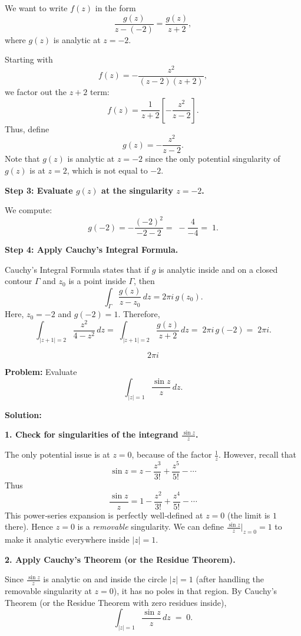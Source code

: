 \documentclass[12pt]{article}
\theoremstyle{definition} %
\theoremstyle{plain} %
\begin{document}
We want to write \(f(z)\) in the form
\[
\frac{g(z)}{z-(-2)} = \frac{g(z)}{z+2},
\]
where \(g(z)\) is analytic at \(z=-2\).

Starting with
\[
f(z) = -\frac{z^2}{(z-2)(z+2)},
\]
we factor out the \(z+2\) term:
\[
f(z) = \frac{1}{z+2}\left[-\frac{z^2}{z-2}\right].
\]
Thus, define
\[
g(z) = -\frac{z^2}{z-2}.
\]
Note that \(g(z)\) is analytic at \(z=-2\) since the only potential singularity of \(g(z)\) is at \(z=2\), which is not equal to \(-2\).

\textbf{Step 3: Evaluate \(g(z)\) at the singularity \(z=-2\).}

We compute:
\[
g(-2) = -\frac{(-2)^2}{-2-2} 
=\; -\frac{4}{-4} 
=\; 1.
\]

\textbf{Step 4: Apply Cauchy's Integral Formula.}

Cauchy's Integral Formula states that if \(g\) is analytic inside and on a closed contour \(\Gamma\) and \(z_0\) is a point inside \(\Gamma\), then
\[
\int_{\Gamma} \frac{g(z)}{z-z_0}\,dz = 2\pi i\, g(z_0).
\]
Here, \(z_0=-2\) and \(g(-2)=1\). Therefore,
\[
\int_{\lvert z+1\rvert=2} \frac{z^2}{4-z^2}\,dz 
=\; \int_{\lvert z+1\rvert=2} \frac{g(z)}{z+2}\,dz 
=\; 2\pi i \,g(-2)
=\; 2\pi i.
\]

\[
\boxed{2\pi i}
\]

\textbf{Problem:} Evaluate
\[
\int_{\lvert z\rvert=1} \frac{\sin z}{z}\,dz.
\]

\textbf{Solution:}

\textbf{1. Check for singularities of the integrand \(\frac{\sin z}{z}\).}

The only potential issue is at \(z=0\), because of the factor \(\frac{1}{z}\). However, recall that
\[
\sin z = z - \frac{z^3}{3!} + \frac{z^5}{5!} - \cdots
\]
Thus
\[
\frac{\sin z}{z}
= 1 - \frac{z^2}{3!} + \frac{z^4}{5!} - \cdots
\]
This power‐series expansion is perfectly well‐defined at \(z=0\) (the limit is \(1\) there). Hence \(z=0\) is a \emph{removable} singularity. We can define 
\(\frac{\sin z}{z}\bigl|_{z=0} = 1\)
to make it analytic everywhere inside \(\lvert z\rvert=1\).

\textbf{2. Apply Cauchy’s Theorem (or the Residue Theorem).}

Since \(\frac{\sin z}{z}\) is analytic on and inside the circle \(\lvert z\rvert=1\) (after handling the removable singularity at \(z=0\)), it has no poles in that region. By Cauchy’s Theorem (or the Residue Theorem with zero residues inside),
\[
\int_{\lvert z\rvert=1} \frac{\sin z}{z}\,dz 
\;=\; 0.
\]
\end{document}
